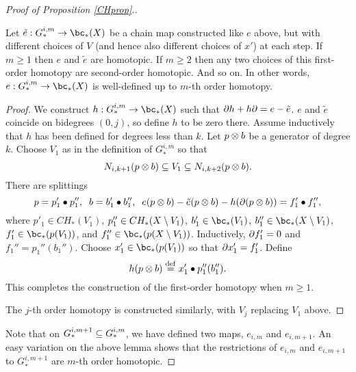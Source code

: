 \begin{proof}[Proof of Proposition \ref{CHprop}.]

\begin{lemma} \label{m_order_hty}
Let $\tilde{e} :  G_*^{i,m} \to \bc_*(X)$ be a chain map constructed like $e$ above, but with
different choices of $V$ (and hence also different choices of $x'$) at each step.
If $m \ge 1$ then $e$ and $\tilde{e}$ are homotopic.
If $m \ge 2$ then any two choices of this first-order homotopy are second-order homotopic.
And so on.
In other words,  $e :  G_*^{i,m} \to \bc_*(X)$ is well-defined up to $m$-th order homotopy.
\end{lemma}

\begin{proof}
We construct $h: G_*^{i,m} \to \bc_*(X)$ such that $\partial h + h\partial = e - \tilde{e}$.
$e$ and $\tilde{e}$ coincide on bidegrees $(0, j)$, so define $h$
to be zero there.
Assume inductively that $h$ has been defined for degrees less than $k$.
Let $p\otimes b$ be a generator of degree $k$.
Choose $V_1$ as in the definition of $G_*^{i,m}$ so that
\[
	N_{i,k+1}(p\otimes b) \subseteq V_1 \subseteq N_{i,k+2}(p\otimes b) .
\]
There are splittings
\[
	p = p'_1\bullet p''_1 , \;\; b = b'_1\bullet b''_1 , 
			\;\; e(p\otimes b) - \tilde{e}(p\otimes b) - h(\partial(p\otimes b)) = f'_1\bullet f''_1 ,
\]
where $p'_1 \in CH_*(V_1)$, $p''_1 \in CH_*(X\setminus V_1)$, 
$b'_1 \in \bc_*(V_1)$, $b''_1 \in \bc_*(X\setmin V_1)$, 
$f'_1 \in \bc_*(p(V_1))$, and $f''_1 \in \bc_*(p(X\setmin V_1))$.
Inductively, $\partial f'_1 = 0$ and $f_1'' = p_1''(b_1'')$.
Choose $x'_1 \in \bc_*(p(V_1))$ so that $\partial x'_1 = f'_1$.
Define 
\[
	h(p\otimes b) \stackrel{\mathrm{def}}{=} x'_1 \bullet p''_1(b''_1) .
\]
This completes the construction of the first-order homotopy when $m \ge 1$.

The $j$-th order homotopy is constructed similarly, with $V_j$ replacing $V_1$ above.
\end{proof}

Note that on $G_*^{i,m+1} \subseteq G_*^{i,m}$, we have defined two maps,
$e_{i,m}$ and $e_{i,m+1}$.
An easy variation on the above lemma shows that 
the restrictions of $e_{i,m}$ and $e_{i,m+1}$ to $G_*^{i,m+1}$ are $m$-th 
order homotopic.


\end{proof}
